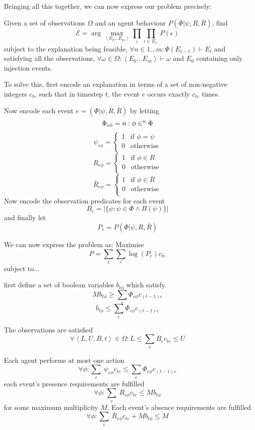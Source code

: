 \documentclass{article}
\begin{document}
Bringing all this together, we can now express our problem precisely:

Given a set of observations $\Omega$ and an agent behaviour $P(\Phi|\psi,R,\bar{R})$, find
\[
\mathcal{E} = \arg\max_{\left<E_0...E_m\right>}\prod_{i}\prod_{\epsilon\in E_i, }P(\epsilon)
\]
subject to the explanation being feasible, $\forall n \in 1...m:  \Psi(E_{t-1}) \vdash E_t$ and satisfying all the observations, $\forall \omega \in \Omega: \left<E_0...E_m\right> \vdash \omega$ and $E_0$ containing only injection events.

To solve this, first encode an explanation in terms of a set of non-negative integers $c_{te}$ such that in timestep $t$, the event $e$ occurs exactly $c_{te}$ times.

Now encode each event $e = (\Phi|\psi,R,\bar{R})$ by letting 
\[
\Phi_{e\phi} = n: \phi \in^n \Phi\\
\]
\[
\psi_{e\phi} = 
\begin{cases}
1&\text{if } \phi = \psi\\
0&\text{otherwise}\\
\end{cases}
\]
\[
R_{e\phi} =
\begin{cases}
1&\text{if } \phi \in R\\
0&\text{otherwise}\\
\end{cases}
\]
\[
\bar{R}_{e\phi} =
\begin{cases}
1&\text{if } \phi \in \bar{R}\\
0&\text{otherwise}\\
\end{cases}
\]
Now encode the observation predicates for each event
\[
B_e = |\{\psi: \psi\in\Phi \wedge B(\psi)\}|
\]
and finally let
\[
P_e = P(\Phi|\psi,R,\bar{R})
\]

We can now express the problem as: Maximise
\[
P = \sum_t\sum_e \log(P_e)c_{te}
\]
subject to...

first define a set of boolean variables $b_{t\phi}$ which satisfy
\[
Mb_{t\phi} \ge \sum_e  \Phi_{e\phi}c_{(t-1)e}
\]
\[
b_{t\phi} \le \sum_e  \Phi_{e\phi}c_{(t-1)e}
\]

The observations are satisfied
\[
\forall \left<L,U,B,t\right> \in \Omega: L \le \sum_e B_e c_{te} \le U
\]

Each agent performs at most one action
\[
\forall\phi: \sum_e\ \psi_{e\phi} c_{te} \le \sum_e  \Phi_{e\phi}c_{(t-1)e}
\]
each event's presence requirements are fulfilled
\[
\forall\phi: \sum_e\ R_{e\phi} c_{te} \le Mb_{t\phi}
\]
for some maximum multiplicity $M$. Each event's absence requirements are fulfilled
\[
\forall\phi: \sum_e\ \bar{R}_{e\phi} c_{te} + Mb_{t\phi} \le M
\]
\end{document}
